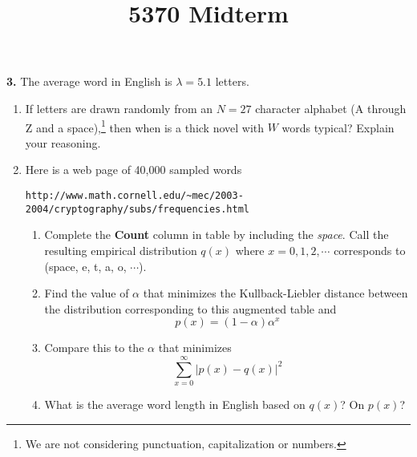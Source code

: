 \documentclass{assignment}
\begin{document}
\title{5370 Midterm}


\textbf{3.}
\label{SquishyBear}
The average word in English is $\lambda =5.1$ letters.
\begin{enumerate}
\item  If letters are drawn randomly from an $N=27$ character alphabet (A through Z and a space),\footnote{
    We are not considering punctuation, capitalization or numbers.
  }
  then when is a thick novel with $W$ words typical? Explain your reasoning.
\item Here is a web page of 40,000 sampled words
  \begin{center}
    \verb"http://www.math.cornell.edu/~mec/2003-2004/cryptography/subs/frequencies.html"
  \end{center}
  \begin{enumerate}
  \item Complete the {\bf Count} column in table by including the {\em space}. Call the resulting empirical distribution $q(x)$ where $x=0,1,2,\cdots$ corresponds to (space, e, t, a, o, $\cdots$).
  \item Find the value of $\alpha$ that minimizes the Kullback-Liebler distance between the distribution corresponding to this augmented table and
    $$p(x) = (1-\alpha) \alpha^x $$
  \item Compare this to the $\alpha$ that minimizes
    $$ \sum_{x=0}^\infty \left| p(x) -  q(x) \right|^2 $$
  \item What is the average word length in English based on $q(x)$? On $p(x)$?
  \end{enumerate}
\end{enumerate}
\end{document}
